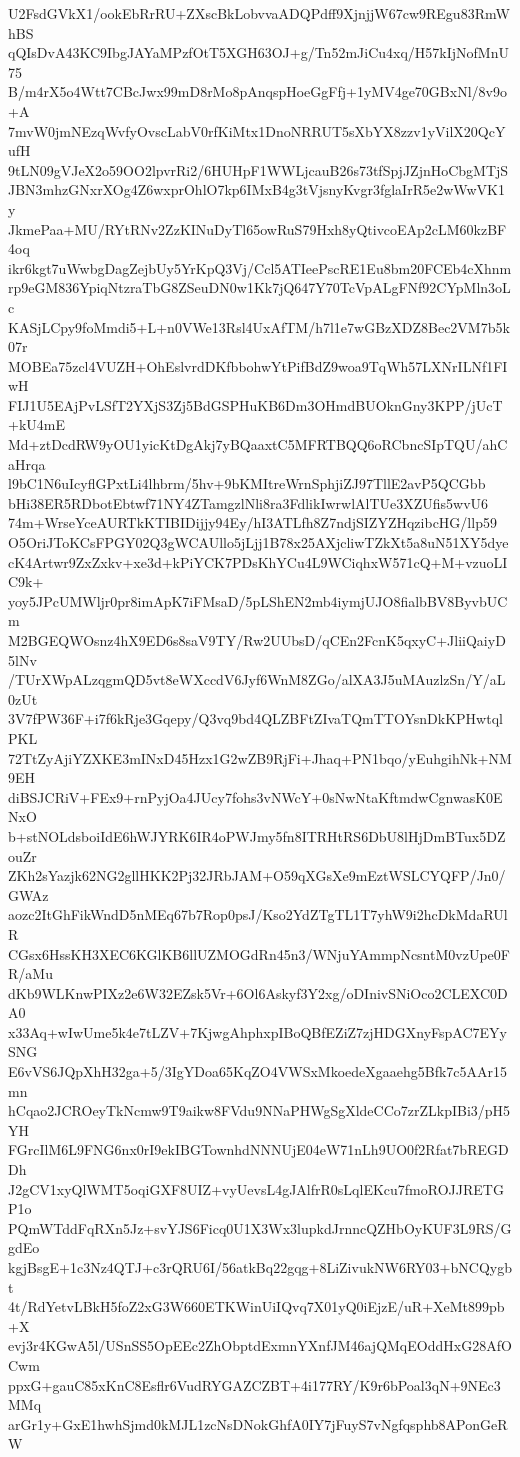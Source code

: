 U2FsdGVkX1/ookEbRrRU+ZXscBkLobvvaADQPdff9XjnjjW67cw9REgu83RmWhBS
qQIsDvA43KC9IbgJAYaMPzfOtT5XGH63OJ+g/Tn52mJiCu4xq/H57kIjNofMnU75
B/m4rX5o4Wtt7CBcJwx99mD8rMo8pAnqspHoeGgFfj+1yMV4ge70GBxNl/8v9o+A
7mvW0jmNEzqWvfyOvscLabV0rfKiMtx1DnoNRRUT5sXbYX8zzv1yVilX20QcYufH
9tLN09gVJeX2o59OO2lpvrRi2/6HUHpF1WWLjcauB26s73tfSpjJZjnHoCbgMTjS
JBN3mhzGNxrXOg4Z6wxprOhlO7kp6IMxB4g3tVjsnyKvgr3fglaIrR5e2wWwVK1y
JkmePaa+MU/RYtRNv2ZzKINuDyTl65owRuS79Hxh8yQtivcoEAp2cLM60kzBF4oq
ikr6kgt7uWwbgDagZejbUy5YrKpQ3Vj/Ccl5ATIeePscRE1Eu8bm20FCEb4cXhnm
rp9eGM836YpiqNtzraTbG8ZSeuDN0w1Kk7jQ647Y70TcVpALgFNf92CYpMln3oLc
KASjLCpy9foMmdi5+L+n0VWe13Rsl4UxAfTM/h7l1e7wGBzXDZ8Bec2VM7b5k07r
MOBEa75zcl4VUZH+OhEslvrdDKfbbohwYtPifBdZ9woa9TqWh57LXNrILNf1FIwH
FIJ1U5EAjPvLSfT2YXjS3Zj5BdGSPHuKB6Dm3OHmdBUOknGny3KPP/jUcT+kU4mE
Md+ztDcdRW9yOU1yicKtDgAkj7yBQaaxtC5MFRTBQQ6oRCbncSIpTQU/ahCaHrqa
l9bC1N6uIcyflGPxtLi4lhbrm/5hv+9bKMItreWrnSphjiZJ97TllE2avP5QCGbb
bHi38ER5RDbotEbtwf71NY4ZTamgzlNli8ra3FdlikIwrwlAlTUe3XZUfis5wvU6
74m+WrseYceAURTkKTIBIDijjy94Ey/hI3ATLfh8Z7ndjSIZYZHqzibcHG/llp59
O5OriJToKCsFPGY02Q3gWCAUllo5jLjj1B78x25AXjcliwTZkXt5a8uN51XY5dye
cK4Artwr9ZxZxkv+xe3d+kPiYCK7PDsKhYCu4L9WCiqhxW571cQ+M+vzuoLIC9k+
yoy5JPcUMWljr0pr8imApK7iFMsaD/5pLShEN2mb4iymjUJO8fialbBV8ByvbUCm
M2BGEQWOsnz4hX9ED6s8saV9TY/Rw2UUbsD/qCEn2FcnK5qxyC+JliiQaiyD5lNv
/TUrXWpALzqgmQD5vt8eWXccdV6Jyf6WnM8ZGo/alXA3J5uMAuzlzSn/Y/aL0zUt
3V7fPW36F+i7f6kRje3Gqepy/Q3vq9bd4QLZBFtZIvaTQmTTOYsnDkKPHwtqlPKL
72TtZyAjiYZXKE3mINxD45Hzx1G2wZB9RjFi+Jhaq+PN1bqo/yEuhgihNk+NM9EH
diBSJCRiV+FEx9+rnPyjOa4JUcy7fohs3vNWcY+0sNwNtaKftmdwCgnwasK0ENxO
b+stNOLdsboiIdE6hWJYRK6IR4oPWJmy5fn8ITRHtRS6DbU8lHjDmBTux5DZouZr
ZKh2sYazjk62NG2gllHKK2Pj32JRbJAM+O59qXGsXe9mEztWSLCYQFP/Jn0/GWAz
aozc2ItGhFikWndD5nMEq67b7Rop0psJ/Kso2YdZTgTL1T7yhW9i2hcDkMdaRUlR
CGsx6HssKH3XEC6KGlKB6llUZMOGdRn45n3/WNjuYAmmpNcsntM0vzUpe0FR/aMu
dKb9WLKnwPIXz2e6W32EZsk5Vr+6Ol6Askyf3Y2xg/oDInivSNiOco2CLEXC0DA0
x33Aq+wIwUme5k4e7tLZV+7KjwgAhphxpIBoQBfEZiZ7zjHDGXnyFspAC7EYySNG
E6vVS6JQpXhH32ga+5/3IgYDoa65KqZO4VWSxMkoedeXgaaehg5Bfk7c5AAr15mn
hCqao2JCROeyTkNcmw9T9aikw8FVdu9NNaPHWgSgXldeCCo7zrZLkpIBi3/pH5YH
FGrcIlM6L9FNG6nx0rI9ekIBGTownhdNNNUjE04eW71nLh9UO0f2Rfat7bREGDDh
J2gCV1xyQlWMT5oqiGXF8UIZ+vyUevsL4gJAlfrR0sLqlEKcu7fmoROJJRETGP1o
PQmWTddFqRXn5Jz+svYJS6Ficq0U1X3Wx3lupkdJrnncQZHbOyKUF3L9RS/GgdEo
kgjBsgE+1c3Nz4QTJ+c3rQRU6I/56atkBq22gqg+8LiZivukNW6RY03+bNCQygbt
4t/RdYetvLBkH5foZ2xG3W660ETKWinUiIQvq7X01yQ0iEjzE/uR+XeMt899pb+X
evj3r4KGwA5l/USnSS5OpEEc2ZhObptdExmnYXnfJM46ajQMqEOddHxG28AfOCwm
ppxG+gauC85xKnC8Esflr6VudRYGAZCZBT+4i177RY/K9r6bPoal3qN+9NEc3MMq
arGr1y+GxE1hwhSjmd0kMJL1zcNsDNokGhfA0IY7jFuyS7vNgfqsphb8APonGeRW
